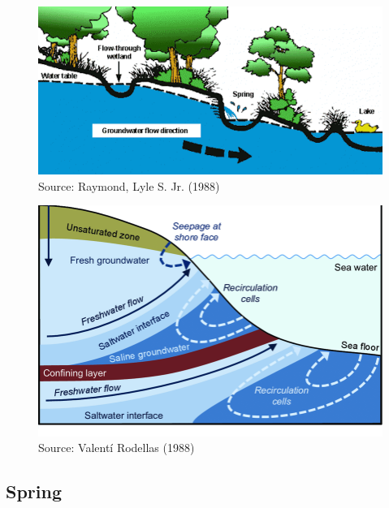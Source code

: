 \documentclass[
  letterpaper,
  DIV=11,
  numbers=noendperiod]{scrreprt}
\begin{document}
\begin{figure}

{\centering \includegraphics{archive/figures/groundwater-discharge.gif}

}

\caption{Source: Raymond, Lyle S. Jr. (1988)}

\end{figure}

\begin{figure}

{\centering \includegraphics{archive/figures/groundwater-discharge-submarine.png}

}

\caption{Source: Valentí Rodellas (1988)}

\end{figure}

\hypertarget{spring}{%
\subsection{Spring}\label{spring}}
\end{document}
